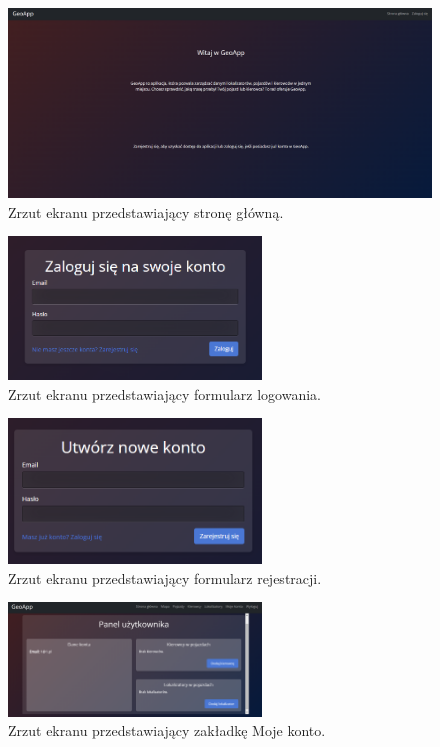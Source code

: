 \begin{figure}
	\centering
	\includegraphics[width=1\textwidth]{./graf/home_page.png}
	\caption{Zrzut ekranu przedstawiający stronę główną.}
	\label{fig:4.1}
\end{figure}

\begin{figure}
	\centering
	\includegraphics[width=0.6\textwidth]{./graf/login_form.png}
	\caption{Zrzut ekranu przedstawiający formularz logowania.}
	\label{fig:4.2}
\end{figure}

\begin{figure}
	\centering
	\includegraphics[width=0.6\textwidth]{./graf/register_form.png}
	\caption{Zrzut ekranu przedstawiający formularz rejestracji.}
	\label{fig:4.3}
\end{figure}

\begin{figure}
	\centering
	\includegraphics[width=0.6\textwidth]{./graf/user_tab.png}
	\caption{Zrzut ekranu przedstawiający zakładkę Moje konto.}
	\label{fig:4.4}
\end{figure}

